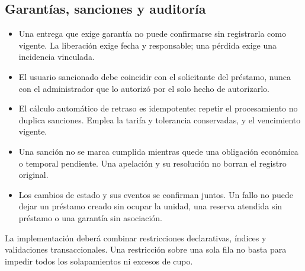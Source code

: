 \subsection{Garant\'ias, sanciones y auditor\'ia}
\begin{itemize}
    \item Una entrega que exige garant\'ia no puede confirmarse sin registrarla como vigente. La liberaci\'on exige fecha y responsable; una p\'erdida exige una incidencia vinculada.
    \item El usuario sancionado debe coincidir con el solicitante del pr\'estamo, nunca con el administrador que lo autoriz\'o por el solo hecho de autorizarlo.
    \item El c\'alculo autom\'atico de retraso es idempotente: repetir el procesamiento no duplica sanciones. Emplea la tarifa y tolerancia conservadas, y el vencimiento vigente.
    \item Una sanci\'on no se marca cumplida mientras quede una obligaci\'on econ\'omica o temporal pendiente. Una apelaci\'on y su resoluci\'on no borran el registro original.
    \item Los cambios de estado y sus eventos se confirman juntos. Un fallo no puede dejar un pr\'estamo creado sin ocupar la unidad, una reserva atendida sin pr\'estamo o una garant\'ia sin asociaci\'on.
\end{itemize}

La implementaci\'on deber\'a combinar restricciones declarativas, \'indices y validaciones transaccionales. Una restricci\'on sobre una sola fila no basta para impedir todos los solapamientos ni excesos de cupo.

